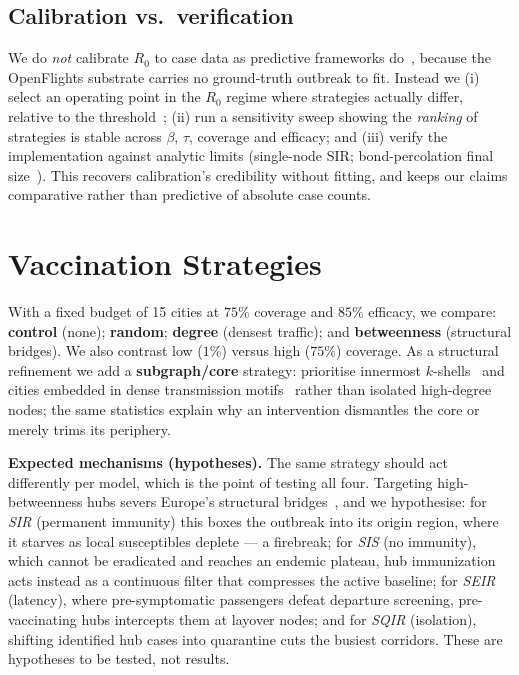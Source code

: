 \documentclass{sigkddExp}
\begin{document}
\subsection{Calibration vs.\ verification}
We do \emph{not} calibrate $R_0$ to case data as predictive frameworks
do~\cite{balcan:gleam}, because the OpenFlights substrate carries no
ground-truth outbreak to fit. Instead we (i) select an operating point in
the $R_0$ regime where strategies actually differ, relative to the
threshold~\cite{colizza:invasion}; (ii) run a sensitivity sweep showing the
\emph{ranking} of strategies is stable across $\beta$, $\tau$, coverage and
efficacy; and (iii) verify the implementation against analytic limits
(single-node SIR; bond-percolation final size~\cite{newman:spread}). This
recovers calibration's credibility without fitting, and keeps our claims
comparative rather than predictive of absolute case counts.

\section{Vaccination Strategies}
With a fixed budget of 15 cities at $75\%$ coverage and $85\%$ efficacy,
we compare: \textbf{control} (none); \textbf{random}; \textbf{degree}
(densest traffic); and \textbf{betweenness} (structural bridges). We also
contrast low ($1\%$) versus high ($75\%$) coverage. As a structural
refinement we add a \textbf{subgraph/core} strategy: prioritise innermost
$k$-shells~\cite{kitsak:spreaders} and cities embedded in dense
transmission motifs~\cite{milo:motifs,przulj:graphlets} rather than
isolated high-degree nodes; the same statistics explain why an
intervention dismantles the core or merely trims its periphery.

\textbf{Expected mechanisms (hypotheses).} The same strategy should act
differently per model, which is the point of testing all four. Targeting
high-betweenness hubs severs Europe's structural
bridges~\cite{pastorsatorras:immunization}, and we hypothesise: for
\emph{SIR} (permanent immunity) this boxes the outbreak into its origin
region, where it starves as local susceptibles deplete --- a firebreak; for
\emph{SIS} (no immunity), which cannot be eradicated and reaches an endemic
plateau, hub immunization acts instead as a continuous filter that
compresses the active baseline; for \emph{SEIR} (latency), where
pre-symptomatic passengers defeat departure screening, pre-vaccinating hubs
intercepts them at layover nodes; and for \emph{SQIR} (isolation), shifting
identified hub cases into quarantine cuts the busiest corridors. These are
hypotheses to be tested, not results.
\end{document}
